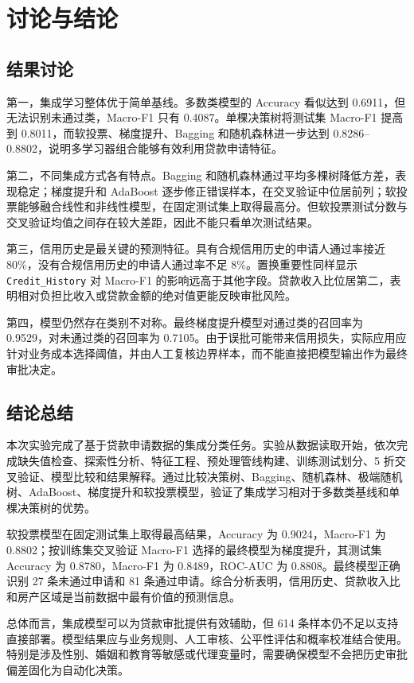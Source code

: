 \documentclass[UTF8,a4paper,12pt]{ctexart}
\begin{document}
\section{讨论与结论}

\subsection{结果讨论}

第一，集成学习整体优于简单基线。多数类模型的 Accuracy 看似达到 0.6911，但无法识别未通过类，Macro-F1 只有 0.4087。单棵决策树将测试集 Macro-F1 提高到 0.8011，而软投票、梯度提升、Bagging 和随机森林进一步达到 0.8286--0.8802，说明多学习器组合能够有效利用贷款申请特征。

第二，不同集成方式各有特点。Bagging 和随机森林通过平均多棵树降低方差，表现稳定；梯度提升和 AdaBoost 逐步修正错误样本，在交叉验证中位居前列；软投票能够融合线性和非线性模型，在固定测试集上取得最高分。但软投票测试分数与交叉验证均值之间存在较大差距，因此不能只看单次测试结果。

第三，信用历史是最关键的预测特征。具有合规信用历史的申请人通过率接近 80\%，没有合规信用历史的申请人通过率不足 8\%。置换重要性同样显示 \texttt{Credit\_History} 对 Macro-F1 的影响远高于其他字段。贷款收入比位居第二，表明相对负担比收入或贷款金额的绝对值更能反映审批风险。

第四，模型仍然存在类别不对称。最终梯度提升模型对通过类的召回率为 0.9529，对未通过类的召回率为 0.7105。由于误批可能带来信用损失，实际应用应针对业务成本选择阈值，并由人工复核边界样本，而不能直接把模型输出作为最终审批决定。

\subsection{结论总结}

本次实验完成了基于贷款申请数据的集成分类任务。实验从数据读取开始，依次完成缺失值检查、探索性分析、特征工程、预处理管线构建、训练测试划分、5 折交叉验证、模型比较和结果解释。通过比较决策树、Bagging、随机森林、极端随机树、AdaBoost、梯度提升和软投票模型，验证了集成学习相对于多数类基线和单棵决策树的优势。

软投票模型在固定测试集上取得最高结果，Accuracy 为 0.9024，Macro-F1 为 0.8802；按训练集交叉验证 Macro-F1 选择的最终模型为梯度提升，其测试集 Accuracy 为 0.8780，Macro-F1 为 0.8489，ROC-AUC 为 0.8808。最终模型正确识别 27 条未通过申请和 81 条通过申请。综合分析表明，信用历史、贷款收入比和房产区域是当前数据中最有价值的预测信息。

总体而言，集成模型可以为贷款审批提供有效辅助，但 614 条样本仍不足以支持直接部署。模型结果应与业务规则、人工审核、公平性评估和概率校准结合使用。特别是涉及性别、婚姻和教育等敏感或代理变量时，需要确保模型不会把历史审批偏差固化为自动化决策。
\end{document}
